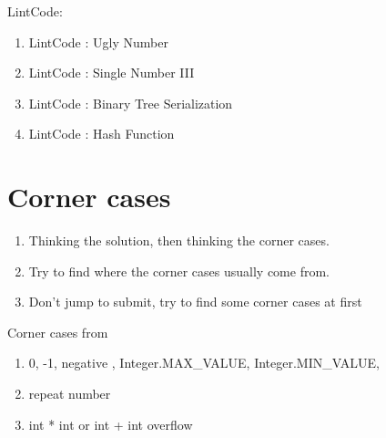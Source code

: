 LintCode:
\begin{enumerate}
    \item LintCode : Ugly Number 
    \item LintCode : Single Number III
    \item LintCode : Binary Tree Serialization 
    \item LintCode : Hash Function
\end{enumerate}

\section{Corner cases}

\begin{enumerate}
    \item Thinking the solution, then thinking the corner cases.
    \item Try to find where the corner cases usually come from.
    \item Don't jump to submit, try to find some corner cases at first
\end{enumerate}

Corner cases from

\begin{enumerate}
    \item  0, -1, negative , Integer.MAX\_VALUE, Integer.MIN\_VALUE,
    \item  repeat number
    \item  int * int or int + int overflow
\end{enumerate}


